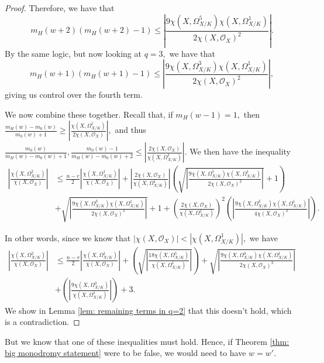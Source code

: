 \documentclass{article}
\theoremstyle{definition}
\theoremstyle{remark}
\begin{document}
\begin{proof}
\par Therefore, we have that $$m_H(w+2)(m_H(w+2) - 1) \leq \left|\frac{9\chi(X, \Omega_{X/K}^5)\chi(X, \Omega_{X/K}^1)}{2\chi(X, \mathcal{O}_{X})^2}\right|.$$ By the same logic, but now looking at $q = 3,$ we have that $$m_H(w+1)(m_H(w+1) - 1) \leq \left|\frac{9\chi(X, \Omega_{X/K}^3)\chi(X, \Omega_{X/K}^1)}{2\chi(X, \mathcal{O}_{X})^2}\right|,$$ giving us control over the fourth term.
\par We now combine these together. Recall that, if $m_H(w-1) = 1,$ then $\frac{m_H(w) - m_0(w)}{m_0(w) + 1} \geq \left|\frac{\chi(X, \Omega^1_{X/K})}{2\chi(X, \mathcal{O}_X)}\right|,$ and thus $\frac{m_0(w)}{m_H(w) - m_0(w) + 1}, \frac{m_0(w) - 1}{m_H(w) - m_0(w) + 2} \leq \left|\frac{2\chi(X, \mathcal{O}_X)}{\chi(X, \Omega^1_{X/K})}\right|.$ We then have the inequality \begin{align*}\left|\frac{\chi(X, \Omega^2_{X/K})}{\chi(X, \mathcal{O}_X)}\right| & \leq \frac{n-r}{2} \left|\frac{\chi(X, \Omega^1_{X/K})}{\chi(X, \mathcal{O}_{X})}\right| + \left|\frac{2\chi(X, \mathcal{O}_X)}{\chi(X, \Omega^1_{X/K})}\right|\left(\sqrt{\left|\frac{9\chi(X, \Omega_{X/K}^5)\chi(X, \Omega_{X/K}^1)}{2\chi(X, \mathcal{O}_{X})^2}\right|} + 1\right)\\ & + \sqrt{\left|\frac{9\chi(X, \Omega_{X/K}^3)\chi(X, \Omega_{X/K}^1)}{2\chi(X, \mathcal{O}_{X})^2}\right|} + 1 + \left(\frac{2\chi(X, \mathcal{O}_X)}{\chi(X, \Omega^1_{X/K})}\right)^2 \left(\left|\frac{9\chi(X, \Omega_{X/K}^3)\chi(X, \Omega_{X/K}^1)}{4\chi(X, \mathcal{O}_{X})^2}\right|\right).\end{align*}
\par In other words, since we know that $|\chi(X, \mathcal{O}_X)| < |\chi(X, \Omega^1_{X/K})|,$ we have \begin{align*}\left|\frac{\chi(X, \Omega^2_{X/K})}{\chi(X, \mathcal{O}_X)}\right| & \leq \frac{n-r}{2} \left|\frac{\chi(X, \Omega^1_{X/K})}{\chi(X, \mathcal{O}_{X})}\right| + \left(\sqrt{\left|\frac{18\chi(X, \Omega_{X/K}^5)}{\chi(X, \Omega_{X/K}^1)}\right|}\right) + \sqrt{\left|\frac{9\chi(X, \Omega_{X/K}^3)\chi(X, \Omega_{X/K}^1)}{2\chi(X, \mathcal{O}_{X})^2}\right|} \\ & + \left(\left|\frac{9\chi(X, \Omega_{X/K}^3)}{\chi(X, \Omega_{X/K}^1)}\right|\right) + 3.\end{align*}
We show in Lemma \ref{lem: remaining terms in q=2} that this doesn't hold, which is a contradiction.
\end{proof}
But we know that one of these inequalities must hold. Hence, if Theorem \ref{thm: big monodromy statement} were to be false, we would need to have $w = w'.$
\end{document}
